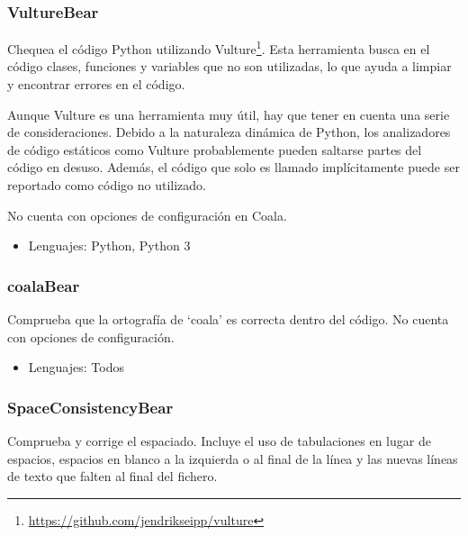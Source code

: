 \documentclass[a4paper, 12pt]{book}
\begin{document}
\subsubsection{VultureBear}
\label{sec:seccion1.2.15}
Chequea el código Python utilizando Vulture\footnote{\url{https://github.com/jendrikseipp/vulture}}. Esta herramienta busca en el código clases, funciones y variables que no son utilizadas, lo que ayuda a limpiar y encontrar errores en el código.

Aunque Vulture es una herramienta muy útil, hay que tener en cuenta una serie de consideraciones. Debido a la naturaleza dinámica de Python, los analizadores de código estáticos como Vulture probablemente pueden saltarse partes del código en desuso. Además, el código que solo es llamado implícitamente puede ser reportado como código no utilizado.

No cuenta con opciones de configuración en Coala.

\begin{itemize}
  \item Lenguajes: Python, Python 3
\end{itemize}

\subsubsection{coalaBear}
\label{sec:seccion1.2.16}
Comprueba que la ortografía de `coala' es correcta dentro del código. No cuenta con opciones de configuración.

\begin{itemize}
  \item Lenguajes: Todos
\end{itemize}

\subsubsection{SpaceConsistencyBear}
\label{sec:seccion1.2.17}
Comprueba y corrige el espaciado. Incluye el uso de tabulaciones en lugar de espacios, espacios en blanco a la izquierda o al final de la línea y las nuevas líneas de texto que falten al final del fichero.
\end{document}
